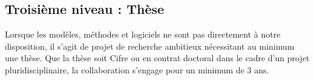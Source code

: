 \subsection*{Troisième niveau : Thèse}
Lorsque les modèles, méthodes et logiciels ne sont pas directement à notre disposition, il s'agit de projet de recherche ambitieux nécessitant au minimum une thèse. Que la thèse soit Cifre ou en contrat doctoral dans le cadre d'un projet pluridisciplinaire, la collaboration s'engage pour un minimum de 3 ans.